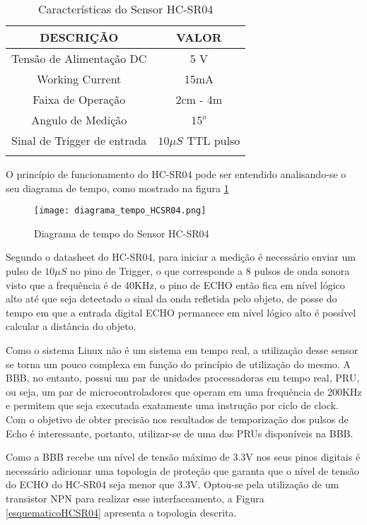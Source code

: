 		\begin{table}[!h]
		\centering
		\caption{Características do Sensor HC-SR04}
		\vspace{0.5cm}
		\begin{tabular}{ c c}
		\hline
		\textbf{DESCRIÇÃO}	&	\textbf{VALOR}\\
		\hline
		Tensão de Alimentação DC & 5 V\\
		\hline
		Working Current & 15mA\\
		\hline
		Faixa de Operação & 2cm -  4m\\
		\hline
		Angulo de Medição &  $15^o$\\
		\hline
		Sinal de Trigger de entrada & $10\mu S$ TTL pulso\\
		\hline

		\label{descricaoHCSR04}
		\end{tabular}
		\end{table}

		O princípio de funcionamento do HC-SR04 pode ser entendido analisando-se o seu diagrama de tempo, como mostrado na figura \ref{diagramatempo}

		\begin{figure}[!h]
			\centering
			\texttt{[image: diagrama\_tempo\_HCSR04.png]}
			\caption{Diagrama de tempo do Sensor HC-SR04}
			\label{diagramatempo}
		\end{figure}

		Segundo o datasheet do HC-SR04, para iniciar a medição é necessário enviar um pulso de $10\mu S$ no pino de Trigger, o que corresponde a 8 pulsos de onda sonora visto que a frequência é de 40KHz, o pino de ECHO então fica em nível lógico alto até que seja detectado o sinal da onda refletida pelo objeto, de posse do tempo em que a entrada digital ECHO permanece em nível lógico alto é possível calcular a distância do objeto.

		Como o sistema Linux não é um sistema em tempo real, a utilização desse sensor se torna um pouco complexa em função do princípio de utilização do mesmo. A BBB, no entanto, possui um par de unidades processadoras em tempo real, PRU, ou seja, um par de microcontroladores que operam em uma frequência de 200KHz e permitem que seja executada exatamente uma instrução por ciclo de clock. Com o objetivo de obter precisão nos resultados de temporização dos pulsos de Echo é interessante, portanto, utilizar-se de uma das PRUs disponíveis na BBB.

		Como a BBB recebe um nível de tensão máximo de 3.3V nos seus pinos digitais é necessário adicionar uma topologia de proteção que garanta que o nível de tensão do ECHO do HC-SR04 seja menor que 3.3V. Optou-se pela utilização de um transistor NPN para realizar esse interfaceamento, a Figura \ref{esquematicoHCSR04} apresenta a topologia descrita.

